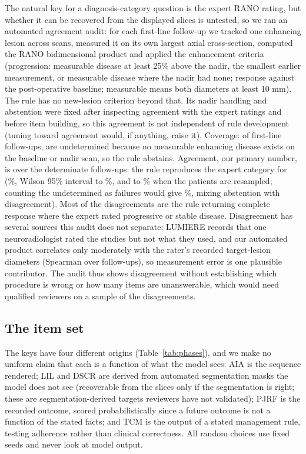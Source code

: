 \documentclass[conference]{IEEEtran}
\begin{document}
The natural key for a diagnosis-category question is the expert RANO rating, but whether it can be recovered from the displayed slices is untested, so we ran an automated agreement audit: for each first-line follow-up we tracked one enhancing lesion across scans, measured it on its own largest axial cross-section, computed the RANO bidimensional product and applied the enhancement criteria (progression: measurable disease at least 25\% above the nadir, the smallest earlier measurement, or measurable disease where the nadir had none; response against the post-operative baseline; measurable means both diameters at least 10 mm). The rule has no new-lesion criterion beyond that. Its nadir handling and abstention were fixed after inspecting agreement with the expert ratings and before item building, so this agreement is not independent of rule development (tuning toward agreement would, if anything, raise it). Coverage: of \vfourFollowups{} first-line follow-ups, \vfourUndetermined{} are undetermined because no measurable enhancing disease exists on the baseline or nadir scan, so the rule abstains. Agreement, our primary number, is over the \vfourDeterminate{} determinate follow-ups: the rule reproduces the expert category for \vfourConcordant{} (\vfourConcordantDetPct{}\%, Wilson 95\% interval \vfourConcordantDetLo{} to \vfourConcordantDetHi{}\%, and \vfourAuditClusterLo{} to \vfourAuditClusterHi{}\% when the \vfourAuditPatients{} patients are resampled; counting the undetermined as failures would give \vfourConcordantPct{}\%, mixing abstention with disagreement). Most of the \vfourDisagree{} disagreements are the rule returning complete response where the expert rated progressive or stable disease. Disagreement has several sources this audit does not separate; LUMIERE records that one neuroradiologist rated the studies but not what they used, and our automated product correlates only moderately with the rater's recorded target-lesion diameters (Spearman \vfourBpRho{} over \vfourBpN{} follow-ups), so measurement error is one plausible contributor. The audit thus shows disagreement without establishing which procedure is wrong or how many items are unanswerable, which would need qualified reviewers on a sample of the disagreements.

\subsection{The item set}
\label{sec:v4}

The keys have four different origins (Table~\ref{tab:phases}), and we make no uniform claim that each is a function of what the model sees: AIA is the sequence rendered; LIL and DSCR are derived from automated segmentation masks the model does not see (recoverable from the slices only if the segmentation is right; these are segmentation-derived targets reviewers have not validated); PJRF is the recorded outcome, scored probabilistically since a future outcome is not a function of the stated facts; and TCM is the output of a stated management rule, testing adherence rather than clinical correctness. All random choices use fixed seeds and never look at model output.
\end{document}
